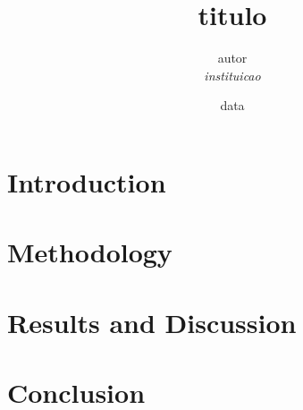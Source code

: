 \documentclass[12pt, a4paper, twocolumn]{article}
{general}
\title{{titulo}}
\author{{autor} \\ \textit{{instituicao}}}
\date{{data}}
\begin{document}
\maketitle

\begin{abstract}

\end{abstract}

\tableofcontents
\newpage

\section{Introduction}


\section{Methodology}


\section{Results and Discussion}


\section{Conclusion}




\end{document}
